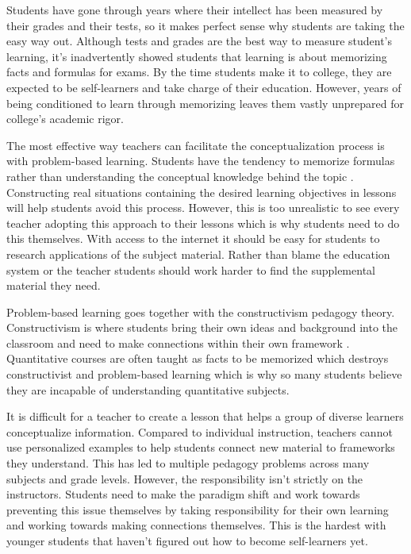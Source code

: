 \documentclass[11pt,]{article}
\begin{document}
Students have gone through years where their intellect has been measured
by their grades and their tests, so it makes perfect sense why students
are taking the easy way out. Although tests and grades are the best way
to measure student's learning, it's inadvertently showed students that
learning is about memorizing facts and formulas for exams. By the time
students make it to college, they are expected to be self-learners and
take charge of their education. However, years of being conditioned to
learn through memorizing leaves them vastly unprepared for college's
academic rigor.

The most effective way teachers can facilitate the conceptualization
process is with problem-based learning. Students have the tendency to
memorize formulas rather than understanding the conceptual knowledge
behind the topic \citet{bilgin2009}. Constructing real situations
containing the desired learning objectives in lessons will help students
avoid this process. However, this is too unrealistic to see every
teacher adopting this approach to their lessons which is why students
need to do this themselves. With access to the internet it should be
easy for students to research applications of the subject material.
Rather than blame the education system or the teacher students should
work harder to find the supplemental material they need.

Problem-based learning goes together with the constructivism pedagogy
theory. Constructivism is where students bring their own ideas and
background into the classroom and need to make connections within their
own framework \citet{kennedy1998}. Quantitative courses are often taught
as facts to be memorized which destroys constructivist and problem-based
learning which is why so many students believe they are incapable of
understanding quantitative subjects.

It is difficult for a teacher to create a lesson that helps a group of
diverse learners conceptualize information. Compared to individual
instruction, teachers cannot use personalized examples to help students
connect new material to frameworks they understand. This has led to
multiple pedagogy problems across many subjects and grade levels.
However, the responsibility isn't strictly on the instructors. Students
need to make the paradigm shift and work towards preventing this issue
themselves by taking responsibility for their own learning and working
towards making connections themselves. This is the hardest with younger
students that haven't figured out how to become self-learners yet.
\end{document}
